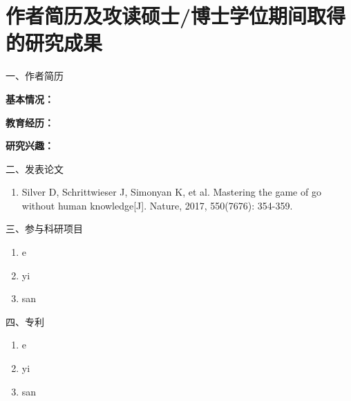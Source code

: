 	\chapter*{作者简历及攻读硕士/博士学位期间取得的研究成果}
	
一、作者简历

	\textbf{基本情况：}
	
 
	\textbf{教育经历：}
	
 
	
	\textbf{研究兴趣：}
	
	 
	
	
二、发表论文
	\setlength\leftmargini{3.5em}
	\renewcommand\labelenumi{[\theenumi]}
	\begin{enumerate}
	\item Silver D, Schrittwieser J, Simonyan K, et al. Mastering the game of go without human knowledge[J]. Nature, 2017, 550(7676): 354-359.

	\end{enumerate}

	三、参与科研项目
	\begin{enumerate}
		\item e
		\item yi
		\item san
	\end{enumerate}

	四、专利
	\begin{enumerate}
		\item e
		\item yi
		\item san
	\end{enumerate}